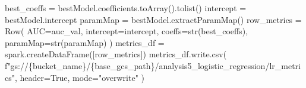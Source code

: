 \documentclass[
  letterpaper,
  DIV=11,
  numbers=noendperiod]{scrartcl}
\newenvironment{Shaded}{\begin{snugshade}}{\end{snugshade}}
\newcommand{\BuiltInTok}[1]{\textcolor[rgb]{0.98,0.46,0.51}{#1}}
\newcommand{\NormalTok}[1]{\textcolor[rgb]{0.88,0.89,0.91}{#1}}
\newcommand{\OperatorTok}[1]{\textcolor[rgb]{0.88,0.89,0.91}{#1}}
\newcommand{\SpecialCharTok}[1]{\textcolor[rgb]{0.47,0.72,1.00}{#1}}
\newcommand{\SpecialStringTok}[1]{\textcolor[rgb]{0.62,0.80,1.00}{#1}}
\newcommand{\StringTok}[1]{\textcolor[rgb]{0.62,0.80,1.00}{#1}}
\newcommand{\VariableTok}[1]{\textcolor[rgb]{1.00,0.67,0.44}{#1}}
\begin{document}
\begin{Shaded}
\begin{Highlighting}[]
\NormalTok{    best\_coeffs }\OperatorTok{=}\NormalTok{ bestModel.coefficients.toArray().tolist()}
\NormalTok{    intercept }\OperatorTok{=}\NormalTok{ bestModel.intercept}
\NormalTok{    paramMap }\OperatorTok{=}\NormalTok{ bestModel.extractParamMap()}
\NormalTok{    row\_metrics }\OperatorTok{=}\NormalTok{ Row(}
\NormalTok{        AUC}\OperatorTok{=}\NormalTok{auc\_val,}
\NormalTok{        intercept}\OperatorTok{=}\NormalTok{intercept,}
\NormalTok{        coeffs}\OperatorTok{=}\BuiltInTok{str}\NormalTok{(best\_coeffs),}
\NormalTok{        paramMap}\OperatorTok{=}\BuiltInTok{str}\NormalTok{(paramMap)}
\NormalTok{    )}
\NormalTok{    metrics\_df }\OperatorTok{=}\NormalTok{ spark.createDataFrame([row\_metrics])}
\NormalTok{    metrics\_df.write.csv(}
        \SpecialStringTok{f"gs://}\SpecialCharTok{\{}\NormalTok{bucket\_name}\SpecialCharTok{\}}\SpecialStringTok{/}\SpecialCharTok{\{}\NormalTok{base\_gcs\_path}\SpecialCharTok{\}}\SpecialStringTok{/analysis5\_logistic\_regression/lr\_metrics"}\NormalTok{,}
\NormalTok{        header}\OperatorTok{=}\VariableTok{True}\NormalTok{,}
\NormalTok{        mode}\OperatorTok{=}\StringTok{"overwrite"}
\NormalTok{    )}


\end{Highlighting}
\end{Shaded}
\end{document}
